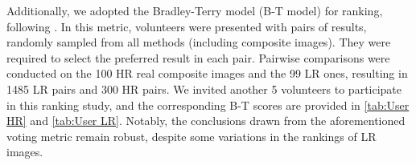 \documentclass[10pt,journal,twocolumn,twoside]{IEEEtran}
\begin{document}
Additionally, we adopted the Bradley-Terry model (B-T model) \cite{bradley1952rank} for ranking, following \cite{cong2020dovenet, ke2022harmonizer}. In this metric, volunteers were presented with pairs of results, randomly sampled from all methods (including composite images). They were required to select the preferred result in each pair. Pairwise comparisons were conducted on the 100 HR real composite images and the 99 LR ones, resulting in 1485 LR pairs and 300 HR pairs. We invited another 5 volunteers to participate in this ranking study, and the corresponding B-T scores are provided in \cref{tab:User HR} and \cref{tab:User LR}. Notably, the conclusions drawn from the aforementioned voting metric remain robust, despite some variations in the rankings of LR images.


\begin{table}[!t]
\caption{Effciency comparison on a single 20482048 image.}
\label{tab:Effi}
\renewcommand{\arraystretch}{1.2} 
\centering
{}
\end{table}



\begin{table}[t]
\caption{The efficiency of the design of MLPs decoupling and LRIP structure. The metrics are evaluated on  images with a batch size of 2.}
    \label{tab:Efficiency of LRIP}
    \renewcommand{\arraystretch}{1.3} 
    \centering
    
\end{table}
\end{document}
